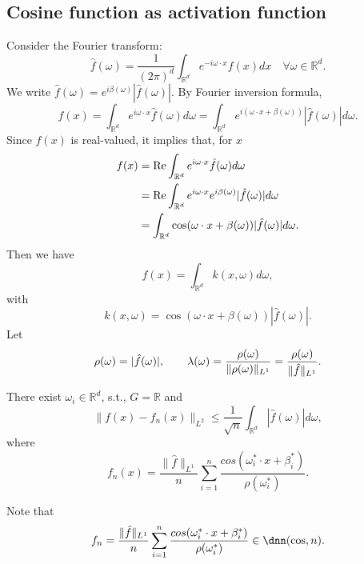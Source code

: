 
\subsection{Cosine function as activation function}
	Consider the Fourier transform:
	\begin{equation}
	  \label{Fourier}
	  \hat f(\omega)=\frac{1}{(2\pi)^d}\int_{\mathbb{R}^d}e^{-i\omega\cdot x}f(x)dx
	  \quad \forall \omega \in \mathbb R^d.
	\end{equation}
	We write  
	$\hat{f}(\omega)=e^{i\beta(\omega)}|\hat{f}(\omega)|$. By Fourier inversion formula,
	\begin{equation}
		\label{eqn1}
		f(x)=\int_{\mathbb{R}^d}e^{i\omega\cdot x}\hat{f}(\omega)d\omega
		=\int_{\mathbb{R}^d}e^{i(\omega\cdot x+\beta(\omega))}|\hat{f}(\omega)|d\omega.
	\end{equation}
Since $f(x)$ is real-valued, it implies that, for $x$
	  \begin{equation}
		\label{key}
		\begin{aligned}
			f(x)
			&={\rm Re}\int_{\mathbb{R}^d}
			e^{i\omega\cdot x} 
			\hat{f}(\omega)d\omega \\
			&={\rm Re}\int_{\mathbb{R}^d}
			e^{i\omega\cdot x}
			e^{i\beta
				(\omega)}|\hat{f}(\omega)|d\omega \\
			&=\int_{\mathbb{R}^d}\cos(\omega\cdot
			x+\beta(\omega))|\hat{f}(\omega)|d\omega.
		\end{aligned}
	\end{equation}
	Then we have 
	\begin{equation}\label{key}
	f(x) =\int_{\mathbb{R}^d}k(x,\omega)d\omega,
	\end{equation}
	with
	\begin{equation}\label{key}
	k(x,\omega) = \cos(\omega\cdot
	x+\beta(\omega))|\hat{f}(\omega)|.
	\end{equation}
	Let 
	$$
	\rho(\omega) = |\hat f(\omega)|,\qquad \lambda(\omega)={\rho(\omega)\over \|\rho(\omega)\|_{L^1}}={\rho(\omega)\over \|\hat f\|_{L^1}}.
	$$ 
	
\begin{theorem}
There exist $\omega_i \in \mathbb{R}^d$, s.t., $G = \mathbb{R}$ and 
\begin{equation}\label{key}
\| f(x) - f_n(x)\|_{L^2} \le \frac{1}{\sqrt{n}} \int_{\mathbb{R}^d} |\hat f(\omega)| d \omega,
\end{equation}
where
\begin{equation}\label{key}
f_n(x)  = \frac{\|\hat f\|_{L^1}}{n} \sum_{i=1}^n \frac{ cos(\omega^*_i \cdot x + \beta^*_i)}{\rho(\omega_i^*)}.
\end{equation}
\end{theorem}
Note that 
\begin{equation}\label{key}
f_n = \frac{\|\hat f\|_{L^1}}{n}\sum_{i=1}^n \frac{ cos(\omega^*_i \cdot x + \beta^*_i)}{\rho(\omega_i^*)} \in \dnn(\cos, n).
\end{equation} 
